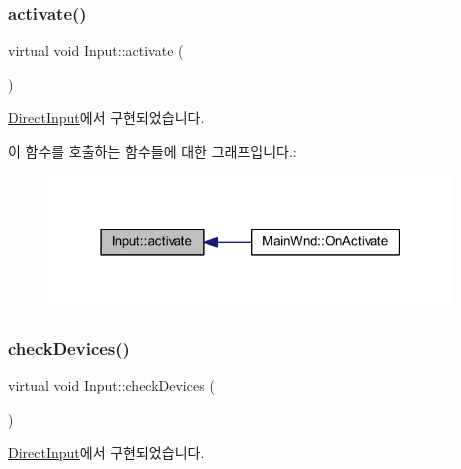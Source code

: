 \subsubsection{\texorpdfstring{activate()}{activate()}}
{\footnotesize\ttfamily virtual void Input\+::activate (\begin{DoxyParamCaption}{ }\end{DoxyParamCaption})\hspace{0.3cm}{\ttfamily [pure virtual]}}



\mbox{\hyperlink{class_direct_input_a4d81c1ee99e76949dac0acac4bad0937}{Direct\+Input}}에서 구현되었습니다.

이 함수를 호출하는 함수들에 대한 그래프입니다.\+:
\nopagebreak
\begin{figure}[H]
\begin{center}
\leavevmode
\includegraphics[width=304pt]{class_input_a5917709c5d9cf1270d430667982895d1_icgraph}
\end{center}
\end{figure}
\mbox{\label{class_input_a7a6ef57ff2638f545380618b2d3fdf9d}} 
\subsubsection{\texorpdfstring{check\+Devices()}{checkDevices()}}
{\footnotesize\ttfamily virtual void Input\+::check\+Devices (\begin{DoxyParamCaption}{ }\end{DoxyParamCaption})\hspace{0.3cm}{\ttfamily [pure virtual]}}



\mbox{\hyperlink{class_direct_input_a59a88d57b359bd26c800579edeb19419}{Direct\+Input}}에서 구현되었습니다.

